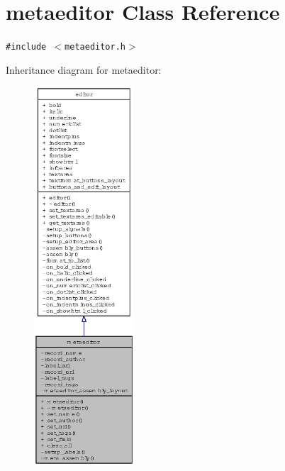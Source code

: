 \section{metaeditor Class Reference}
\label{classmetaeditor}
{\tt \#include $<$metaeditor.h$>$}

Inheritance diagram for metaeditor:\begin{figure}[H]
\begin{center}
\leavevmode
\includegraphics[width=106pt]{classmetaeditor__inherit__graph}
\end{center}
\end{figure}
